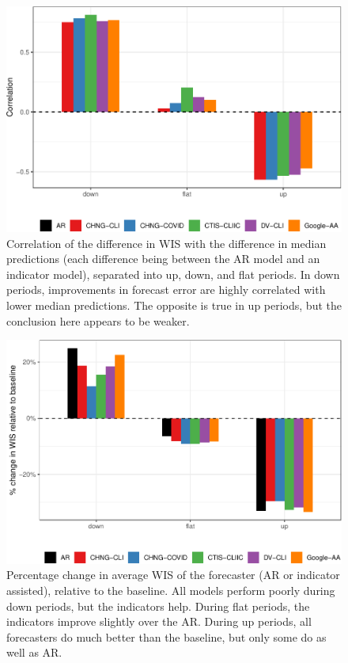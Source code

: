 \documentclass[9pt,twoside,lineno]{pnas-new}
\begin{document}
\clearpage

\begin{figure}

{\centering \includegraphics[width=\textwidth]{fig/upswing-corr-table-1} 

}

\caption{Correlation of the difference in WIS with the difference in median predictions (each difference being between the AR model and an indicator model), separated into up, down, and flat periods. In down periods, improvements in forecast error are highly correlated with lower median predictions. The opposite is true in up periods, but the conclusion here appears to be weaker.}\label{fig:upswing-corr-table}
\end{figure}

\clearpage

\begin{figure}

{\centering \includegraphics[width=\textwidth]{fig/upswing-summary-remake-1} 

}

\caption{Percentage change in average WIS of the forecaster (AR or indicator assisted), relative to the baseline. All models perform poorly during down periods, but the indicators help. During flat periods, the indicators improve slightly over the AR. During up periods, all forecasters do much better than the baseline, but only some do as well as AR.}\label{fig:upswing-summary-remake}
\end{figure}
\end{document}

